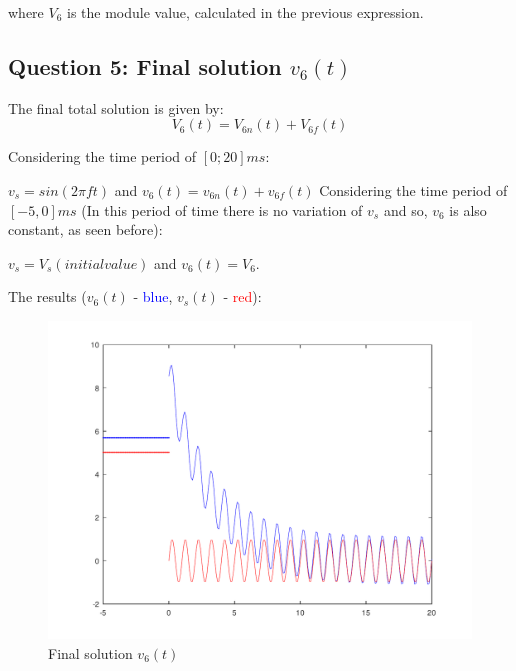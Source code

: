 where $V_6$ is the module value, calculated in the previous expression.



\subsection{Question 5: Final solution $v_{6}(t)$ }
The final total solution is given by:
\begin{equation}
     V_6(t) = V_{6n}(t) + V_{6f}(t)
\end{equation}\par
Considering the time period of $[0 ; 20]ms$: \par $v_s = sin(2\pi ft)$ and $v_6(t)= v_{6n}(t) + v_{6f}(t)$
Considering the time period of $[-5,0]ms$ (In this period of time there is no variation of $v_s$ and so, $v_6$ is also constant, as seen before):\par $v_s = V_s (initial value)$ and $v_6(t) =V_6$.\par
The results ($v_6(t)$ - \textcolor{blue}{blue}, $v_s (t)$ - \textcolor{red}{red}):
\begin{figure}[H] \centering
\includegraphics[width=0.7\linewidth]{../mat/alinea5.pdf}
\caption{Final solution $v_{6}(t)$}
\label{fig:plot5}
\end{figure}

